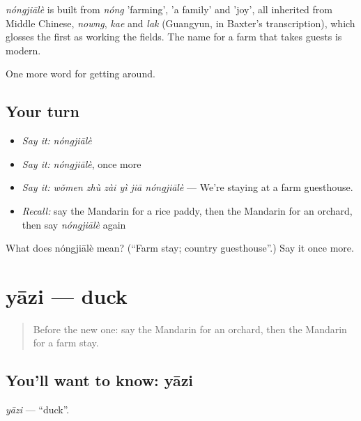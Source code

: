 \begin{cousinweb}
\emph{nóngjiālè} is built from \emph{nóng} 'farming',  'a family' and  'joy', all inherited from Middle Chinese, \emph{nowng}, \emph{kae} and \emph{lak} (Guangyun, in Baxter's transcription), which glosses the first as working the fields. The name for a farm that takes guests is modern.
\end{cousinweb}

\begin{grammarlens}[title={What you've built}]
One more word for getting around.
\end{grammarlens}

\subsection*{Your turn}
\begin{itemize}
\raggedright
  \item \emph{Say it:} \emph{nóngjiālè}
  \item \emph{Say it:} \emph{nóngjiālè}, once more
  \item \emph{Say it:} \emph{wǒmen zhù zài yì jiā nóngjiālè} — We're staying at a farm guesthouse.
  \item \emph{Recall:} say the Mandarin for a rice paddy, then the Mandarin for an orchard, then say \emph{nóngjiālè} again
\end{itemize}

\begin{tcolorbox}[breakable,colback=teal!4,colframe=teal!35!black,title={Before you move on}]
What does nóngjiālè mean? (\textquotedblleft{}Farm stay; country guesthouse\textquotedblright{}.) Say it once more.
\end{tcolorbox}
\section[yāzi]{yāzi — duck}

\label{lesson:ZH-C439-yazi}



\begin{quote}
Before the new one: say the Mandarin for an orchard, then the Mandarin for a farm stay.
\end{quote}

\subsection*{You'll want to know: yāzi}
\emph{yāzi} — \textquotedblleft{}duck\textquotedblright{}.

